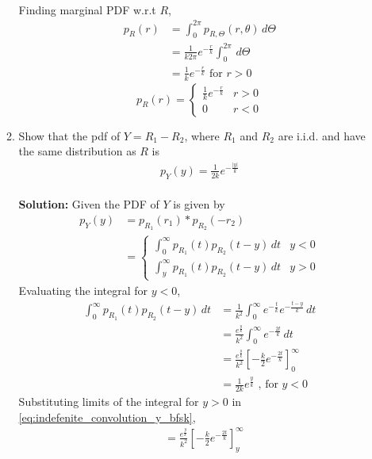 \documentclass[journal,8pt,onecolumn]{IEEEtran}
\providecommand{\sbrak}[1]{\ensuremath{{}\left[#1\right]}}
\providecommand{\brak}[1]{\ensuremath{\left(#1\right)}}
\providecommand{\abs}[1]{\left\vert#1\right\vert}
\newcommand{\solution}{\noindent \textbf{Solution: }}
\begin{document}
\begin{enumerate}
\begin{enumerate}[label=(\alph{enumii})]
\begin{align}
\end{align}
Finding marginal PDF w.r.t $R$,
\begin{align}
	p_{R}\brak{r} &= \int_{0}^{2\pi} p_{R,\Theta}\brak{r,\theta} \,d\Theta\\
	&= \frac{1}{k2\pi}e^{-\frac{r}{k}} \int_{0}^{2\pi} \,d\Theta\\
	&= \frac{1}{k}e^{-\frac{r}{k}} \text{ for $r > 0$}
\end{align}
\begin{equation}
	p_{R}\brak{r} = 
	\begin{cases}
		\frac{1}{k} e^{-\frac{r}{k}} & r > 0\\
		0 & r < 0
	\end{cases}
	\label{eq:noncoh_bfsk_pdf_y}
\end{equation}
%
\item
Show that the pdf of $Y = R_1-R_2$, where $R_1$ and $R_2$ are i.i.d. and have the same distribution as $R$ is
%
\begin{align}
p_{Y}(y) = \frac{1}{2k}e^{-\frac{\abs{y}}{k}}
\end{align}\\
\solution Given the PDF of $Y$ is given by
\begin{align}
	p_{Y}\brak{y} &= p_{R_1}\brak{r_1} \ast p_{R_2}\brak{-r_2}\\
	&=
	\begin{cases}
		\int_{0}^{\infty} p_{R_1}\brak{t} p_{R_2}\brak{t-y}  \,dt & y < 0\\
		\int_{y}^{\infty} p_{R_1}\brak{t} p_{R_2}\brak{t-y}  \,dt & y > 0
	\end{cases}
\end{align}
Evaluating the integral for $y < 0$,
\begin{align}
	\int_{0}^{\infty} p_{R_1}\brak{t} p_{R_2}\brak{t-y}  \,dt &= \frac{1}{k^2} \int_{0}^{\infty} e^{-\frac{t}{k}}e^{-\frac{t-y}{k}} \,dt\\
	&= \frac{e^{\frac{y}{k}}}{k^2} \int_{0}^{\infty} e^{-\frac{2t}{k}} \,dt\\
	\label{eq:indefenite_convolution_y_bfsk}
	&= \frac{e^{\frac{y}{k}}}{k^2} \sbrak{-\frac{k}{2}e^{-\frac{2t}{k}}}_{0}^{\infty}\\
	\label{eq:noncoh_bfsk_conv_y_p1}
	&= \frac{1}{2k}e^{\frac{y}{k}} \text{ , for $y < 0$}
\end{align}
Substituting limits of the integral for $y > 0$ in \eqref{eq:indefenite_convolution_y_bfsk},
\begin{align}
	&= \frac{e^{\frac{y}{k}}}{k^2} \sbrak{-\frac{k}{2}e^{-\frac{2t}{k}}}_{y}^{\infty}\\

\end{align}
\end{enumerate}
\end{enumerate}
\end{document}
